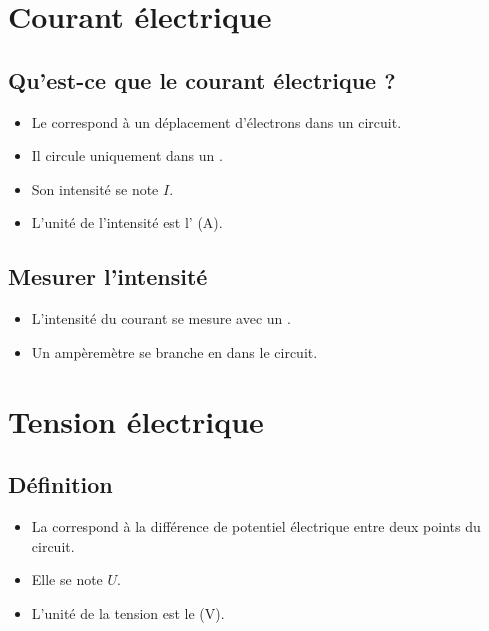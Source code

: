 \documentclass[12pt]{article}
\begin{document}


\section{Courant électrique}

\subsection{Qu’est-ce que le courant électrique ?}

\begin{itemize}
    \item Le  correspond à un déplacement d’électrons dans un circuit.
    \item Il circule uniquement dans un .
    \item Son intensité se note \(I\).
    \item L’unité de l’intensité est l’ (A).
\end{itemize}

\subsection{Mesurer l’intensité}


\begin{itemize}
    \item L’intensité du courant se mesure avec un .
    \item Un ampèremètre se branche en  dans le circuit.
\end{itemize}

\section{Tension électrique}

\subsection{Définition}

\begin{itemize}
    \item La  correspond à la différence de potentiel électrique entre deux points du circuit.
    \item Elle se note \(U\).
    \item L’unité de la tension est le  (V).
\end{itemize}
\end{document}
